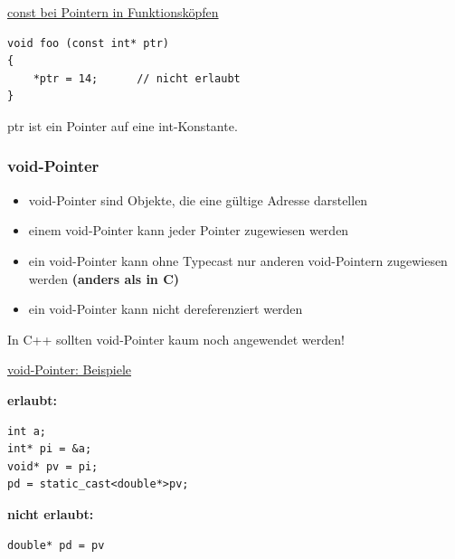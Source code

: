 \underline{const bei Pointern in Funktionsköpfen}\\
\noindent
\begin{minipage}{0.45\linewidth}
\vspace{-\baselineskip}
\begin{lstlisting}
void foo (const int* ptr)
{
	*ptr = 14;		// nicht erlaubt
}
\end{lstlisting}
\end{minipage}
\hspace{0.01\linewidth}
\begin{minipage}{0.5\linewidth}
ptr ist ein Pointer auf eine int-Konstante.
\vfill\null
\end{minipage}

\subsubsection{void-Pointer}
\begin{itemize}
	\item void-Pointer sind Objekte, die eine gültige Adresse darstellen
	\item einem void-Pointer kann jeder Pointer zugewiesen werden
	\item ein void-Pointer kann ohne Typecast nur anderen void-Pointern zugewiesen werden \textbf{(anders als in C)}
	\item ein void-Pointer kann nicht dereferenziert werden
\end{itemize}
\begin{hinweis}
In C++ sollten void-Pointer kaum noch angewendet werden!
\end{hinweis}
\pagebreak\newpage
\underline{void-Pointer: Beispiele}\\
\begin{minipage}{0.4\linewidth}
\textbf{erlaubt:}
\vspace{-\baselineskip}
\begin{lstlisting}
int a;
int* pi = &a;
void* pv = pi;
pd = static_cast<double*>pv;
\end{lstlisting}
\vfill\null
\end{minipage}
\hspace{0.01\linewidth}
\begin{minipage}{0.2\linewidth}
\textbf{nicht erlaubt:}
\vspace{-\baselineskip}
\begin{lstlisting}
double* pd = pv	
\end{lstlisting}
\vfill\null
\end{minipage}

